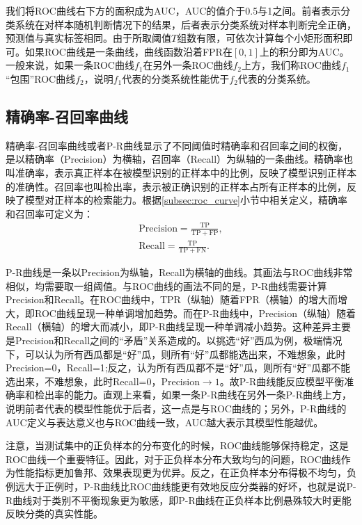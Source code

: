 我们将ROC曲线右下方的面积成为AUC，AUC的值介于0.5与1之间。前者表示分类系统在对样本随机判断情况下的结果，后者表示分类系统对样本判断完全正确，预测值与真实标签相同。由于所取阈值$T$组数有限，可依次计算每个小矩形面积即可。如果ROC曲线是一条曲线，曲线函数沿着FPR在$[0,1]$上的积分即为AUC。一般来说，如果一条ROC曲线$f_1$在另外一条ROC曲线$f_2$上方，我们称ROC曲线$f_1$“包围”ROC曲线$f_2$，说明$f_1$代表的分类系统性能优于$f_2$代表的分类系统。
\subsection{精确率-召回率曲线}\label{subsec:pr_curve}
精确率-召回率曲线或者P-R曲线显示了不同阈值时精确率和召回率之间的权衡，是以精确率（Precision）为横轴，召回率（Recall）为纵轴的一条曲线。精确率也叫准确率，表示真正样本在被模型识别的正样本中的比例，反映了模型识别正样本的准确性。召回率也叫检出率，表示被正确识别的正样本占所有正样本的比例，反映了模型对正样本的检索能力。根据\ref{subsec:roc_curve}小节中相关定义，精确率和召回率可定义为：
\begin{gather}
	\mathrm{Precision}=\frac{\mathrm{TP}}{\mathrm{TP}+\mathrm{FP}},\\
	\mathrm{Recall}=\frac{\mathrm{TP}}{\mathrm{TP}+\mathrm{FN}}.
\end{gather}

P-R曲线是一条以Precision为纵轴，Recall为横轴的曲线。其画法与ROC曲线非常相似，均需要取一组阈值。与ROC曲线的画法不同的是，P-R曲线需要计算Precision和Recall。在ROC曲线中，TPR（纵轴）随着FPR（横轴）的增大而增大，即ROC曲线呈现一种单调增加趋势。而在P-R曲线中，Precision（纵轴）随着Recall（横轴）的增大而减小，即P-R曲线呈现一种单调减小趋势。这种差异主要是Precision和Recall之间的“矛盾”关系造成的。以挑选“好”西瓜为例，极端情况下，可以认为所有西瓜都是“好”瓜，则所有“好”瓜都能选出来，不难想象，此时Precision=0，Recall=1;反之，认为所有西瓜都不是“好”瓜，则所有“好”瓜都不能选出来，不难想象，此时Recall=0，Precision$\to 1$。故P-R曲线能反应模型平衡准确率和检出率的能力。直观上来看，如果一条P-R曲线在另外一条P-R曲线上方，说明前者代表的模型性能优于后者，这一点是与ROC曲线的；另外，P-R曲线的AUC定义与表达意义也与ROC曲线一致，AUC越大表示其模型性能越优。

注意，当测试集中的正负样本的分布变化的时候，ROC曲线能够保持稳定，这是ROC曲线一个重要特征。因此，对于正负样本分布大致均匀的问题，ROC曲线作为性能指标更加鲁邦、效果表现更为优异。反之，在正负样本分布得极不均匀，负例远大于正例时，P-R曲线比ROC曲线能更有效地反应分类器的好坏，也就是说P-R曲线对于类别不平衡现象更为敏感，即P-R曲线在正负样本比例悬殊较大时更能反映分类的真实性能。
